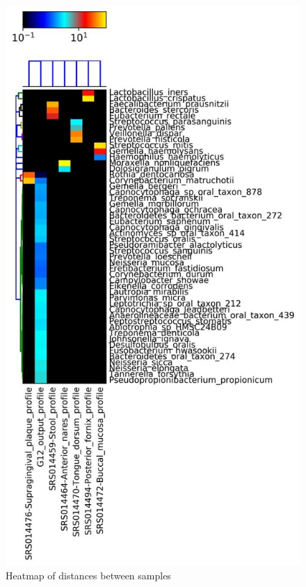 \documentclass{article}
\begin{document}
\begin{figure}[h]
	\centering
	\includegraphics[scale=2.747]{4}  
	\caption{ Heatmap of distances between samples  }
	\label{heatmap4}
\end{figure}  
\end{document}
